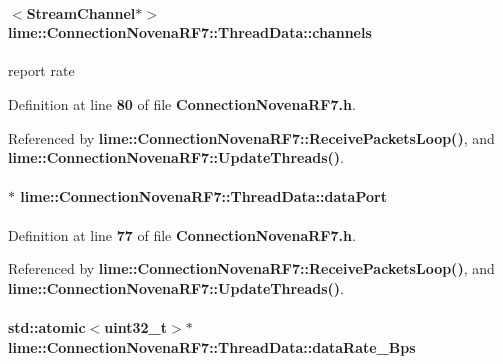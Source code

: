 \paragraph[{channels}]{$<${\bf Stream\+Channel}$\ast$$>$ lime\+::\+Connection\+Novena\+R\+F7\+::\+Thread\+Data\+::channels}\label{structlime_1_1ConnectionNovenaRF7_1_1ThreadData_a5067b3af7e4acfc4103417f1a05e86c7}


report rate 



Definition at line {\bf 80} of file {\bf Connection\+Novena\+R\+F7.\+h}.



Referenced by {\bf lime\+::\+Connection\+Novena\+R\+F7\+::\+Receive\+Packets\+Loop()}, and {\bf lime\+::\+Connection\+Novena\+R\+F7\+::\+Update\+Threads()}.

\paragraph[{data\+Port}]{$\ast$ lime\+::\+Connection\+Novena\+R\+F7\+::\+Thread\+Data\+::data\+Port}\label{structlime_1_1ConnectionNovenaRF7_1_1ThreadData_a9e4a93195dc134e3258d71fbbd08e158}


Definition at line {\bf 77} of file {\bf Connection\+Novena\+R\+F7.\+h}.



Referenced by {\bf lime\+::\+Connection\+Novena\+R\+F7\+::\+Receive\+Packets\+Loop()}, and {\bf lime\+::\+Connection\+Novena\+R\+F7\+::\+Update\+Threads()}.

\paragraph[{data\+Rate\+\_\+\+Bps}]{\setlength{\rightskip}{0pt plus 5cm}std\+::atomic$<$uint32\+\_\+t$>$$\ast$ lime\+::\+Connection\+Novena\+R\+F7\+::\+Thread\+Data\+::data\+Rate\+\_\+\+Bps}\label{structlime_1_1ConnectionNovenaRF7_1_1ThreadData_a2ecedefd28a721ab0641a732a53965bd}


